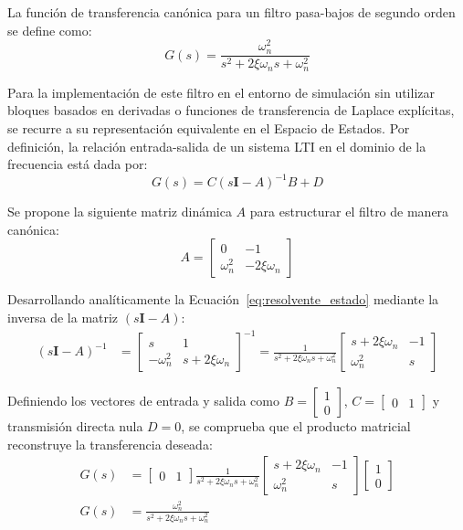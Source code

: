 \documentclass[10pt,a4paper]{article}
\begin{document}
La función de transferencia canónica para un filtro pasa-bajos de segundo orden se define como:
\begin{equation}
    G(s) = \frac{\omega_n^2}{s^2 + 2\xi\omega_n s + \omega_n^2}
    \label{eq:transferencia_filtro_2do_orden}
\end{equation}

Para la implementación de este filtro en el entorno de simulación sin utilizar bloques basados en derivadas o funciones de transferencia de Laplace explícitas, se recurre a su representación equivalente en el Espacio de Estados. Por definición, la relación entrada-salida de un sistema LTI en el dominio de la frecuencia está dada por:
\begin{equation}
    G(s) = C(s\mathbf{I} - A)^{-1}B + D
    \label{eq:resolvente_estado}
\end{equation}

Se propone la siguiente matriz dinámica $A$ para estructurar el filtro de manera canónica:
\begin{equation}
    A = \begin{bmatrix} 0 & -1 \\ \omega_n^2 & -2\xi\omega_n \end{bmatrix}
\end{equation}

Desarrollando analíticamente la Ecuación~\eqref{eq:resolvente_estado} mediante la inversa de la matriz $(s\mathbf{I} - A)$:
\begin{align*}
    (s\mathbf{I} - A)^{-1} &= \begin{bmatrix} s & 1 \\ -\omega_n^2 & s + 2\xi\omega_n \end{bmatrix}^{-1} = \frac{1}{s^2 + 2\xi\omega_n s + \omega_n^2} \begin{bmatrix} s + 2\xi\omega_n & -1 \\ \omega_n^2 & s \end{bmatrix}
\end{align*}

Definiendo los vectores de entrada y salida como $B = \begin{bmatrix} 1 \\ 0 \end{bmatrix}$, $C = \begin{bmatrix} 0 & 1 \end{bmatrix}$ y transmisión directa nula $D = 0$, se comprueba que el producto matricial reconstruye la transferencia deseada:
\begin{align}
    G(s) &= \begin{bmatrix} 0 & 1 \end{bmatrix} \frac{1}{s^2 + 2\xi\omega_n s + \omega_n^2} \begin{bmatrix} s + 2\xi\omega_n & -1 \\ \omega_n^2 & s \end{bmatrix} \begin{bmatrix} 1 \\ 0 \end{bmatrix} \nonumber \\
    G(s) &= \frac{\omega_n^2}{s^2 + 2\xi\omega_n s + \omega_n^2}
\end{align}
\end{document}
